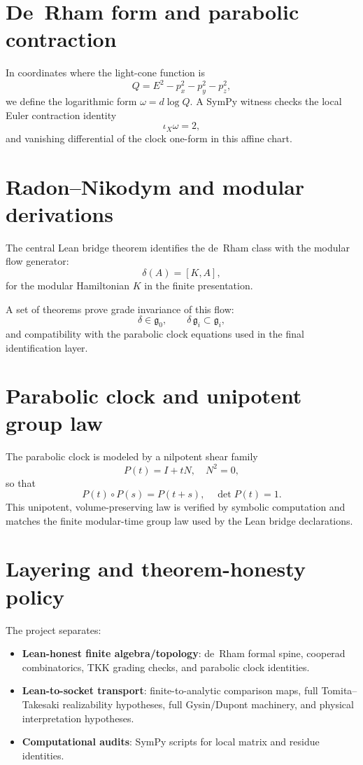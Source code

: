 \documentclass[11pt]{article}
\begin{document}
\section{De~Rham form and parabolic contraction}
In coordinates where the light-cone function is
\[
Q = E^2-p_x^2-p_y^2-p_z^2,
\]
we define the logarithmic form $\omega=d\log Q$.  A SymPy witness checks the local
Euler contraction identity
\[
\iota_X \omega = 2,
\]
and vanishing differential of the clock one-form in this affine chart.

\section{Radon--Nikodym and modular derivations}
The central Lean bridge theorem identifies the de~Rham class with the modular
flow generator:
\begin{equation}
\delta(A)=[K,A],
\end{equation}
for the modular Hamiltonian $K$ in the finite presentation.

A set of theorems prove grade invariance of this flow:
\[
\delta \in \mathfrak g_0,\qquad
\delta\,\mathfrak g_i \subset \mathfrak g_i,
\]
and compatibility with the parabolic clock equations used in the final
identification layer.

\section{Parabolic clock and unipotent group law}
The parabolic clock is modeled by a nilpotent shear family
\[ P(t)=I+tN,\quad N^2=0,\]
so that
\[P(t)\circ P(s)=P(t+s),\quad \det P(t)=1.\]
This unipotent, volume-preserving law is verified by symbolic computation and
matches the finite modular-time group law used by the Lean bridge declarations.

\section{Layering and theorem-honesty policy}
The project separates:
\begin{itemize}[leftmargin=*]
  \item\textbf{Lean-honest finite algebra/topology}: de~Rham formal spine,
  cooperad combinatorics, TKK grading checks, and parabolic clock identities.
  \item\textbf{Lean-to-socket transport}: finite-to-analytic comparison maps,
  full Tomita--Takesaki realizability hypotheses, full Gysin/Dupont machinery,
  and physical interpretation hypotheses.
  \item\textbf{Computational audits}: SymPy scripts for local matrix and residue
  identities.
\end{itemize}
\end{document}
